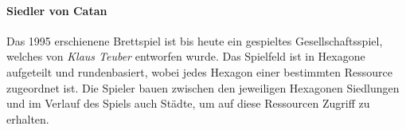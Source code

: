 \paragraph*{Siedler von Catan} Das 1995 erschienene Brettspiel ist bis heute ein gespieltes Gesellschaftsspiel, welches von \textit{Klaus Teuber} entworfen wurde. Das Spielfeld ist in Hexagone aufgeteilt und rundenbasiert, wobei jedes Hexagon einer bestimmten Ressource zugeordnet ist. Die Spieler bauen zwischen den jeweiligen Hexagonen Siedlungen und im Verlauf des Spiels auch Städte, um auf diese Ressourcen Zugriff zu erhalten. 
